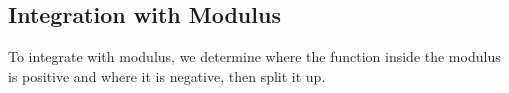 \subsection*{\quad Integration with Modulus}
To integrate with modulus, we determine where the function inside the modulus is positive and where it is negative, then split it up.
\exlab
{}

